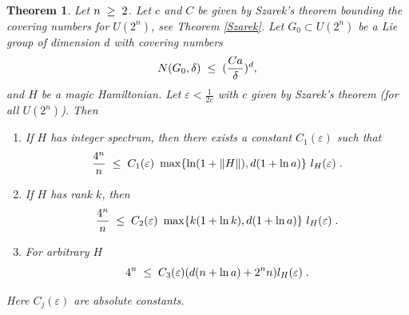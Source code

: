 \documentclass[12pt, a4-paper]{amsart}
\numberwithin{equation}{section}
\newcommand{\kl}{\pl \le \pl}
\newcommand{\gl}{\pl \ge \pl}
\newcommand{\p}{\hspace{.05cm}}
\newcommand{\pl}{\hspace{.1cm}}
\newcommand{\eps}{\varepsilon}
\newtheorem{theorem}[lemma]{Theorem}
\begin{document}
\begin{theorem}\label{entropy} Let $n\gl 2$. Let $c$ and $C$ be given by Szarek's theorem bounding the covering numbers for $U(2^n)$, see Theorem \ref{Szarek}. Let $G_0\subset U(2^n)$ be a Lie group of dimension $d$ with covering numbers
 \[ N(G_0,\delta) \kl (\frac{Ca}{\delta})^d, \]
and $H$ be a magic Hamiltonian. Let $\eps<\frac{1}{2c}$ with $c$ given by Szarek's theorem (for all $U(2^n)$). Then   
 \begin{enumerate}
 \item[i)] If $H$ has integer spectrum, then there exists a constant $C_1(\eps)$ such that 
  \[ \frac{4^n}{n} \kl C_1(\eps) ~\max \{\ln (1+\|H\|),d(1+\ln a)\}~ l_H(\eps) \pl .\] 
 \item[ii)] If $H$ has rank $k$, then 
   \[ \frac{4^n}{n} \kl C_2(\eps) ~\max \{k(1+\ln k),d(1+\ln a) \}~ l_H(\eps) \pl .\] 
 \item[iii)] For arbitrary $H$ 
 \[ 4^{n}  \kl C_3(\eps)(d(n+ \ln a) + 2^nn) l_H(\eps) \pl. \]
\end{enumerate} 
Here $C_j(\eps)$ are absolute constants. 
\end{theorem}
\end{document}
